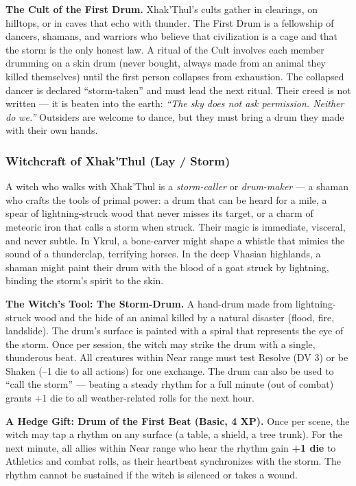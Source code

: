 \textbf{The Cult of the First Drum.} Xhak'Thul's cults gather in clearings, on hilltops, or in caves that echo with thunder. The First Drum is a fellowship of dancers, shamans, and warriors who believe that civilization is a cage and that the storm is the only honest law. A ritual of the Cult involves each member drumming on a skin drum (never bought, always made from an animal they killed themselves) until the first person collapses from exhaustion. The collapsed dancer is declared ``storm-taken'' and must lead the next ritual. Their creed is not written --- it is beaten into the earth: \textit{``The sky does not ask permission. Neither do we.''} Outsiders are welcome to dance, but they must bring a drum they made with their own hands.

\subsubsection*{Witchcraft of Xhak'Thul (Lay / Storm)}

A witch who walks with Xhak'Thul is a \textit{storm-caller} or \textit{drum-maker} --- a shaman who crafts the tools of primal power: a drum that can be heard for a mile, a spear of lightning-struck wood that never misses its target, or a charm of meteoric iron that calls a storm when struck. Their magic is immediate, visceral, and never subtle. In Ykrul, a bone-carver might shape a whistle that mimics the sound of a thunderclap, terrifying horses. In the deep Vhasian highlands, a shaman might paint their drum with the blood of a goat struck by lightning, binding the storm's spirit to the skin.

\textbf{The Witch's Tool: The Storm-Drum.} A hand-drum made from lightning-struck wood and the hide of an animal killed by a natural disaster (flood, fire, landslide). The drum's surface is painted with a spiral that represents the eye of the storm. Once per session, the witch may strike the drum with a single, thunderous beat. All creatures within Near range must test Resolve (DV 3) or be Shaken (--1 die to all actions) for one exchange. The drum can also be used to ``call the storm'' --- beating a steady rhythm for a full minute (out of combat) grants +1 die to all weather-related rolls for the next hour.

\textbf{A Hedge Gift: Drum of the First Beat (Basic, 4 XP).} Once per scene, the witch may tap a rhythm on any surface (a table, a shield, a tree trunk). For the next minute, all allies within Near range who hear the rhythm gain \textbf{+1 die} to Athletics and combat rolls, as their heartbeat synchronizes with the storm. The rhythm cannot be sustained if the witch is silenced or takes a wound.

